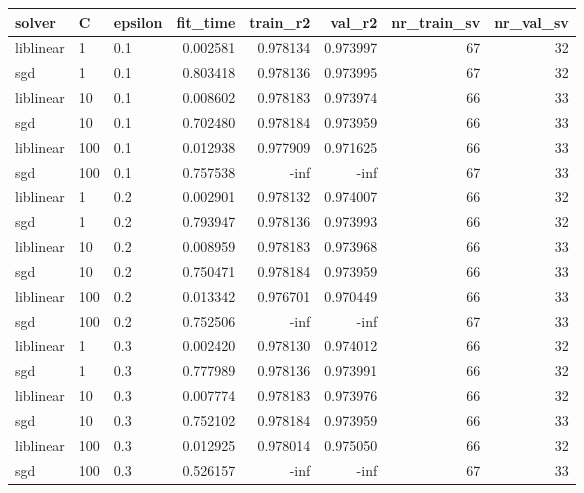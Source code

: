 \begin{tabular}{lllrrrrr}
\toprule
   solver &   C & epsilon &  fit\_time &  train\_r2 &   val\_r2 &  nr\_train\_sv &  nr\_val\_sv \\
\midrule
liblinear &   1 &     0.1 &  0.002581 &  0.978134 & 0.973997 &           67 &         32 \\
      sgd &   1 &     0.1 &  0.803418 &  0.978136 & 0.973995 &           67 &         32 \\
liblinear &  10 &     0.1 &  0.008602 &  0.978183 & 0.973974 &           66 &         33 \\
      sgd &  10 &     0.1 &  0.702480 &  0.978184 & 0.973959 &           66 &         33 \\
liblinear & 100 &     0.1 &  0.012938 &  0.977909 & 0.971625 &           66 &         33 \\
      sgd & 100 &     0.1 &  0.757538 &      -inf &     -inf &           67 &         33 \\
liblinear &   1 &     0.2 &  0.002901 &  0.978132 & 0.974007 &           66 &         32 \\
      sgd &   1 &     0.2 &  0.793947 &  0.978136 & 0.973993 &           66 &         32 \\
liblinear &  10 &     0.2 &  0.008959 &  0.978183 & 0.973968 &           66 &         33 \\
      sgd &  10 &     0.2 &  0.750471 &  0.978184 & 0.973959 &           66 &         33 \\
liblinear & 100 &     0.2 &  0.013342 &  0.976701 & 0.970449 &           66 &         33 \\
      sgd & 100 &     0.2 &  0.752506 &      -inf &     -inf &           67 &         33 \\
liblinear &   1 &     0.3 &  0.002420 &  0.978130 & 0.974012 &           66 &         32 \\
      sgd &   1 &     0.3 &  0.777989 &  0.978136 & 0.973991 &           66 &         32 \\
liblinear &  10 &     0.3 &  0.007774 &  0.978183 & 0.973976 &           66 &         32 \\
      sgd &  10 &     0.3 &  0.752102 &  0.978184 & 0.973959 &           66 &         33 \\
liblinear & 100 &     0.3 &  0.012925 &  0.978014 & 0.975050 &           66 &         32 \\
      sgd & 100 &     0.3 &  0.526157 &      -inf &     -inf &           67 &         33 \\
\bottomrule
\end{tabular}
